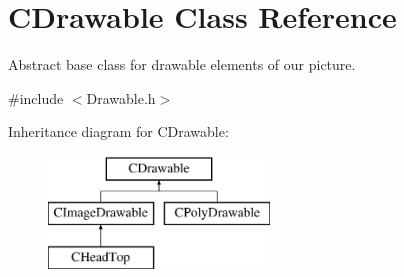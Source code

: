 \hypertarget{class_c_drawable}{\section{C\+Drawable Class Reference}
\label{class_c_drawable}
}


Abstract base class for drawable elements of our picture.  




{\ttfamily \#include $<$Drawable.\+h$>$}

Inheritance diagram for C\+Drawable\+:\begin{figure}[H]
\begin{center}
\leavevmode
\includegraphics[height=3.000000cm]{class_c_drawable}
\end{center}
\end{figure}
